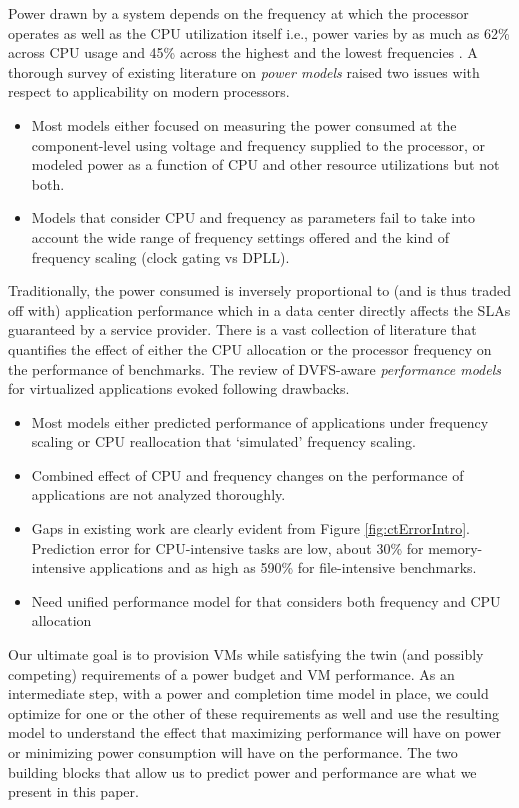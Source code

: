 \documentclass{sig-alternate}
\begin{document}
Power drawn by a system depends on the frequency at which the processor operates as well as the CPU utilization itself i.e., power varies by as much as 62\% across CPU usage and 45\% across the highest and the lowest frequencies \cite{swetechreport}. A thorough survey of existing literature on \emph{power models} raised two issues with respect to applicability on modern processors. 
\begin{itemize}
 \item Most models either focused on measuring the power consumed at the component-level using voltage and frequency supplied to the processor, or modeled power as a function of CPU and other resource utilizations but not both.
 \item Models that consider CPU and frequency as parameters fail to take into account the wide range of frequency settings offered and the kind of frequency scaling (clock gating vs DPLL).
\end{itemize}
Traditionally, the power consumed is inversely proportional to (and is thus traded off with) application performance which in a data center directly affects the SLAs guaranteed by a service provider. There is a vast collection of literature that quantifies the effect of either the CPU allocation or the processor frequency on the performance of benchmarks. The review of DVFS-aware \emph{performance models} for virtualized applications evoked following drawbacks. 
\begin{itemize}
 \item Most models either predicted performance of applications under frequency scaling or CPU reallocation that `simulated' frequency scaling. 
 \item Combined effect of CPU and frequency changes on the performance of applications are not analyzed thoroughly.
 \item Gaps in existing work are clearly evident from Figure \ref{fig:ctErrorIntro}. Prediction error for CPU-intensive tasks are low, about 30\% for memory-intensive applications and as high as 590\% for file-intensive benchmarks. 
 \item Need unified performance model for that considers both frequency and CPU allocation
\end{itemize}

Our ultimate goal is to provision VMs while satisfying the twin (and possibly competing) requirements of a power budget and VM performance. As an intermediate step, with a power and completion time model in place, we could optimize for one or the other of these requirements as well and use the resulting model to understand the effect that maximizing performance will have on power or minimizing power consumption will have on the performance. The two building blocks that allow us to predict power and performance are what we present in this paper. 
\end{document}
